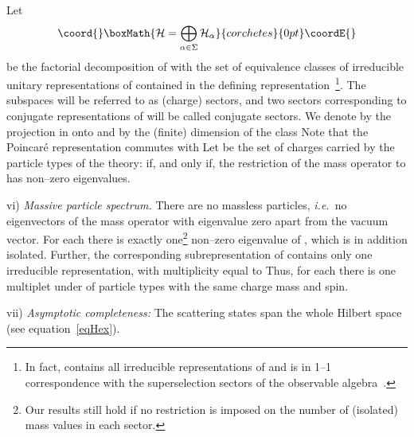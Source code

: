 \documentclass[a4paper,reqno,11pt]{amsart}
\theoremstyle{plain}
\theoremstyle{definition}
\numberwithin{equation}{section}
\providecommand{\calH}{{\mathcal H}}
\providecommand{\Potild}{\tilde{P}_+^{\uparrow}}
\providecommand{\Sec}{\Sigma} %
\renewcommand{\sec}{\alpha}
\providecommand{\Sece}{\Sec^{(1)}} %
\providecommand{\Hsec}{\calH_{\sec}}
\providecommand{\Esec}{E_{\sec}}
\providecommand{\msec}{{m_{\sec}}}
\begin{document}
Let 
\[\coord{}\boxMath{ \calH = \bigoplus_{\sec\in\Sec} \Hsec
}{corchetes}{0pt}\coordE{}\]
be the factorial decomposition of \coordHE{} %
with \myHighlight{$\Sec$}\coordHE{} the set of equivalence classes of irreducible unitary
representations of \coordHE{} contained in the defining 
representation~\footnote{In fact, \myHighlight{$\Sec$}\coordHE{} contains all irreducible 
  representations of \coordHE{} and is in 1--1 correspondence with
  the superselection sectors of the observable algebra~\cite{DHRI}.}.  
The subspaces \myHighlight{$\Hsec$}\coordHE{} will be referred to as (charge) sectors, and two 
sectors corresponding to conjugate representations \myHighlight{$\sec,\bar\sec$}\coordHE{} of \coordHE{} 
will be called conjugate sectors. We denote by \myHighlight{$\Esec$}\coordHE{} the projection
in \myHighlight{$\calH$}\coordHE{} onto \myHighlight{$\Hsec,$}\coordHE{} and by \myHighlight{$d_\sec$}\coordHE{}  the (finite) dimension of the class 
\myHighlight{$\sec.$}\coordHE{} Note that the Poincar\'e representation commutes with \myHighlight{$\Esec.$}\coordHE{} 
Let \myHighlight{$\Sece\subset \Sec$}\coordHE{} be the set of charges carried by the 
particle types of the theory: \myHighlight{$\sec\in\Sece$}\coordHE{} if, and only if, the 
restriction of the mass  operator \coordHE{} to \myHighlight{$\Hsec$}\coordHE{} 
has non--zero eigenvalues. 

 vi) {\em Massive particle spectrum.} There are no massless particles,
 {\it i.e.\ }no eigenvectors of the mass operator with eigenvalue zero
   apart from the vacuum vector. For each \myHighlight{$\sec\in\Sece,$}\coordHE{} there
 is exactly one\footnote{Our results still hold if no restriction is
   imposed on the number of (isolated) mass values in each sector.}  
non--zero eigenvalue \myHighlight{$\msec$}\coordHE{} of \myHighlight{$\sqrt{P^2}\Esec$}\coordHE{}, which is in 
addition isolated.  Further, the 
corresponding sub\-re\-presentation of \myHighlight{$\Potild$}\coordHE{} contains only one
irreducible representation, with multiplicity equal to 
\myHighlight{$d_\sec.$}\coordHE{} Thus, for each \myHighlight{$\sec\in\Sece,$}\coordHE{} there is one multiplet under \coordHE{} of 
particle types with the same charge \myHighlight{$\sec,$}\coordHE{} mass and spin. 

 vii) {\em Asymptotic completeness:} The scattering states span the
 whole Hilbert space (see  equation~\eqref{eqHex}). 
\end{document}
